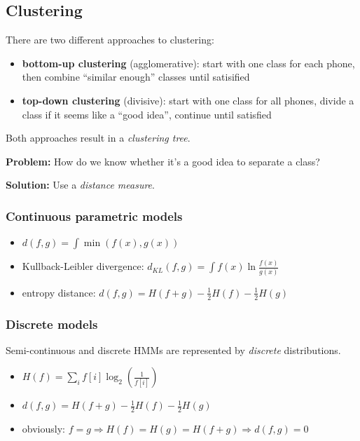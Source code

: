 \documentclass[11pt]{article}
\begin{document}
\subsection{Clustering}

There are two different approaches to clustering:
\begin{itemize}
    \item \textbf{bottom-up clustering} (agglomerative): start with one class for each phone, then combine ``similar enough'' classes until satisified
    \item \textbf{top-down clustering} (divisive): start with one class for all phones, divide a class if it seems like a ``good idea'', continue until satisfied
\end{itemize}

Both approaches result in a \textit{clustering tree}.

\vspace{10pt}
\textbf{Problem:} How do we know whether it's a good idea to separate a class? 

\vspace{5pt}

\textbf{Solution:} Use a \textit{distance measure}.
\vspace{10pt}

\subsubsection{Continuous parametric models}
\begin{itemize}
    \item $d(f, g) = \int \min(f(x), g(x))$
    \item Kullback-Leibler divergence: $d_{KL}(f, g) = \int f(x) \ln \frac{f(x)}{g(x)}$
    \item entropy distance: $d(f, g) = H(f + g) - \frac{1}{2} H(f) - \frac{1}{2} H(g)$
\end{itemize}

\subsubsection{Discrete models}
Semi-continuous and discrete HMMs are represented by \textit{discrete} distributions.
\begin{itemize}
    \item $H(f) = \sum\limits_i f[i] \log_2(\frac{1}{f[i]})$
    \item $d(f, g) = H(f + g) - \frac{1}{2} H(f) - \frac{1}{2} H(g)$
    \item obviously: $f = g \Rightarrow H(f) = H(g) = H(f + g) \Rightarrow d(f, g) = 0$
\end{itemize}
\end{document}
